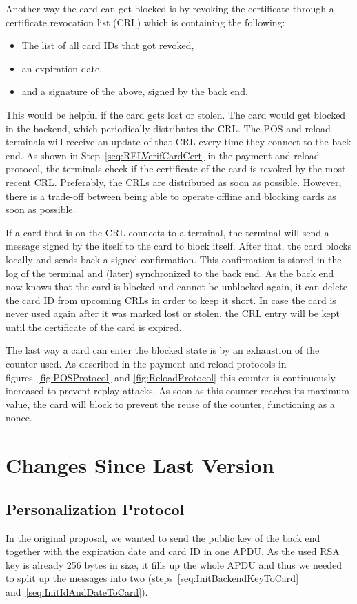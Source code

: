 \documentclass{article}
\begin{document}
Another way the card can get blocked is by revoking the certificate through a certificate revocation list (CRL) which is containing the following:
\begin{itemize}
    \item The list of all card IDs that got revoked,
    \item an expiration date,
    \item and a signature of the above, signed by the back end.
\end{itemize}
This would be helpful if the card gets lost or stolen.
The card would get blocked in the backend, which periodically distributes the CRL.
The POS and reload terminals will receive an update of that CRL every time they connect to the back end.
As shown in Step~\ref{seq:RELVerifCardCert} in the payment and reload protocol, the terminals check if the certificate of the card is revoked by the most recent CRL\@.
Preferably, the CRLs are distributed as soon as possible. 
However, there is a trade-off between being able to operate offline and blocking cards as soon as possible.

If a card that is on the CRL connects to a terminal, the terminal will send a message signed by the itself to the card to block itself.
After that, the card blocks locally and sends back a signed confirmation.
This confirmation is stored in the log of the terminal and (later) synchronized to the back end.
As the back end now knows that the card is blocked and cannot be unblocked again, it can delete the card ID from upcoming CRLs in order to keep it short.
In case the card is never used again after it was marked lost or stolen, the CRL entry will be kept until the certificate of the card is expired.

The last way a card can enter the blocked state is by an exhaustion of the counter used.
As described in the payment and reload protocols in figures~\ref{fig:POSProtocol} and \ref{fig:ReloadProtocol} this counter is continuously increased to prevent replay attacks.
As soon as this counter reaches its maximum value, the card will block to prevent the reuse of the counter, functioning as a nonce.

\section{Changes Since Last Version}
    \subsection{Personalization Protocol}
    In the original proposal, we wanted to send the public key of the back end together with the expiration date and card ID in one APDU\@.
    As the used RSA key is already 256 bytes in size, it fills up the whole APDU and thus we needed to split up the messages into two (steps~\ref{seq:InitBackendKeyToCard} and~\ref{seq:InitIdAndDateToCard}).
\end{document}
